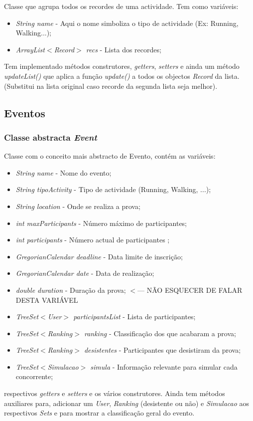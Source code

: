 \documentclass[10pt,notitlepage]{article}
\begin{document}
Classe que agrupa todos os recordes de uma actividade. Tem como variáveis:
\begin{itemize}
\item \textit{String name} - Aqui o nome simboliza o tipo de actividade (Ex: Running, Walking...);
\item \textit{ArrayList$<$Record$>$ recs} - Lista dos recordes;
\end{itemize}
Tem implementado métodos construtores, \textit{getters}, \textit{setters} e ainda um método \textit{updateList()} que aplica a função \textit{update()} a todos os objectos \textit{Record} da lista. (Substitui na lista original caso recorde da segunda lista seja melhor).







\subsection{Eventos}

\subsubsection{Classe abstracta \textit{Event}}
Classe com o conceito mais abstracto de Evento, contém as variáveis:
\begin{itemize}
\item \textit{String name} - Nome do evento;
\item \textit{String tipoActivity} - Tipo de actividade (Running, Walking, ...);
\item \textit{String location} - Onde se realiza a prova;
\item \textit{int maxParticipants} - Número máximo de participantes;
\item \textit{int participants} - Número actual de participantes ;
\item \textit{GregorianCalendar deadline} - Data limite de inscrição;
\item \textit{GregorianCalendar date} - Data de realização;
\item \textit{double duration} - Duração da prova;  $<$--- NÃO ESQUECER DE FALAR DESTA VARIÁVEL
\item \textit{TreeSet$<$User$>$ participantsList} - Lista de participantes;
\item \textit{TreeSet$<$Ranking$>$ ranking} - Classificação dos que acabaram a prova;
\item \textit{TreeSet$<$Ranking$>$ desistentes} - Participantes que desistiram da prova;
\item \textit{TreeSet$<$Simulacao$>$ simula} - Informação relevante para simular cada concorrente;
\end{itemize}
respectivos \textit{getters} e \textit{setters} e os vários construtores. Ainda tem métodos auxiliares para, adicionar um \textit{User}, \textit{Ranking} (desistente ou não) e \textit{Simulacao} aos respectivos \textit{Sets} e para mostrar a classificação geral do evento.
\end{document}
